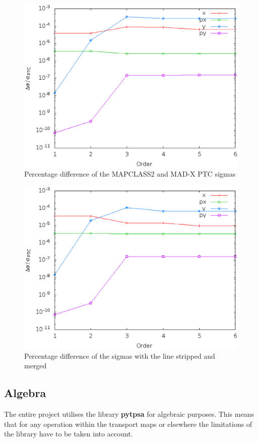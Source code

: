 \documentclass[a4paper]{cernatsnote}
\begin{document}
\begin{figure}[!hbt]
  \centering
  \includegraphics[width=0.8\columnwidth]{imgs/dsigma.eps}
  \caption{Percentage difference of the MAPCLASS2 and MAD-X PTC sigmas}
  \label{dsigma}
\end{figure}

\begin{figure}[!hbt]
  \centering
  \includegraphics[width=0.8\columnwidth]{imgs/dsigma+strip+merge.eps}
  \caption{Percentage difference of the sigmas with the line stripped
    and merged}
  \label{dsigma+s+m}
\end{figure}

\subsection{Algebra}
The entire project utilises the library \textbf{pytpsa} for algebraic
purposes. This means that for any operation within the transport maps
or elsewhere the limitations of the library have to be taken into
account.
\end{document}
